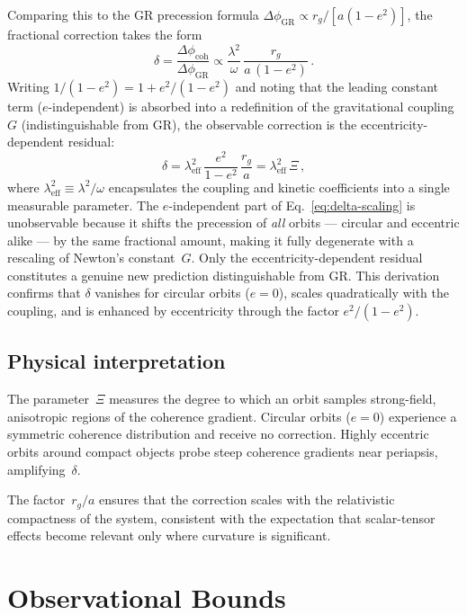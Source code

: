 \documentclass[showpacs,preprintnumbers,amsmath,amssymb,prd,longbibliography]{revtex4-2}
\begin{document}
Comparing this to the GR precession formula
$\Delta\phi_{\mathrm{GR}} \propto r_g/[a(1-e^2)]$,
the fractional correction takes the form
\begin{equation}
\delta = \frac{\Delta\phi_{\mathrm{coh}}}{\Delta\phi_{\mathrm{GR}}}
\propto \frac{\lambda^2}{\omega}\,\frac{r_g}{a\,(1-e^2)}\,.
\label{eq:delta-scaling}
\end{equation}
Writing $1/(1-e^2) = 1 + e^2/(1-e^2)$ and noting that the
leading constant term ($e$-independent) is absorbed into a
redefinition of the gravitational coupling~$G$
(indistinguishable from GR),
the observable correction is the eccentricity-dependent
residual:
\begin{equation}
\delta = \lambda_{\mathrm{eff}}^2\,
\frac{e^2}{1-e^2}\,\frac{r_g}{a}
= \lambda_{\mathrm{eff}}^2\,\Xi\,,
\end{equation}
where $\lambda_{\mathrm{eff}}^2 \equiv \lambda^2/\omega$
encapsulates the coupling and kinetic coefficients into a
single measurable parameter.
The $e$-independent part of Eq.~\eqref{eq:delta-scaling}
is unobservable because it shifts the precession of
\emph{all} orbits --- circular and eccentric alike --- by
the same fractional amount, making it fully degenerate
with a rescaling of Newton's constant~$G$.
Only the eccentricity-dependent residual constitutes a
genuine new prediction distinguishable from GR.
This derivation confirms that $\delta$ vanishes for circular
orbits ($e=0$), scales quadratically with the coupling,
and is enhanced by eccentricity through the factor
$e^2/(1-e^2)$.

\subsection{Physical interpretation}

The parameter~$\Xi$ measures the degree to which an orbit
samples strong-field, anisotropic regions of the coherence
gradient.
Circular orbits ($e = 0$) experience a symmetric coherence
distribution and receive no correction.
Highly eccentric orbits around compact objects probe steep
coherence gradients near periapsis, amplifying~$\delta$.

The factor~$r_g/a$ ensures that the correction scales with
the relativistic compactness of the system, consistent with
the expectation that scalar-tensor effects become relevant
only where curvature is significant.

\section{Observational Bounds}
\label{sec:bounds}
\end{document}
